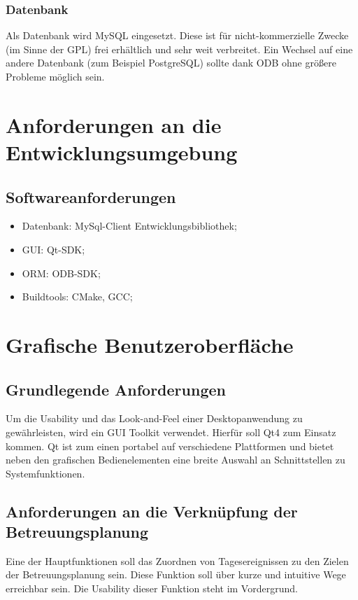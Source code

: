 \documentclass[a4paper,10pt]{article}
\begin{document}
\subsubsection{Datenbank}
Als Datenbank wird MySQL eingesetzt. Diese ist für nicht-kommerzielle Zwecke (im Sinne der GPL) frei erhältlich und sehr weit verbreitet. 
Ein Wechsel auf eine andere Datenbank (zum Beispiel PostgreSQL) sollte dank ODB ohne größere Probleme möglich sein.

\section{Anforderungen an die Entwicklungsumgebung}
\subsection{Softwareanforderungen}
\begin{itemize}
	\item Datenbank: MySql-Client Entwicklungsbibliothek;
	\item GUI: Qt-SDK; 
	\item ORM: ODB-SDK;
	\item Buildtools: CMake, GCC;
\end{itemize}
\section{Grafische Benutzeroberfläche}
\subsection{Grundlegende Anforderungen}
Um die Usability und das Look-and-Feel einer Desktopanwendung zu gewährleisten, wird ein GUI Toolkit verwendet.
Hierfür soll Qt4 zum Einsatz kommen. Qt ist zum einen portabel auf verschiedene Plattformen 
und bietet neben den grafischen Bedienelementen eine breite Auswahl an Schnittstellen zu Systemfunktionen.
\subsection{Anforderungen an die Verknüpfung der Betreuungsplanung}
Eine der Hauptfunktionen soll das Zuordnen von Tagesereignissen zu den Zielen der Betreuungsplanung sein. Diese Funktion soll über 
kurze und intuitive Wege erreichbar sein. Die Usability dieser Funktion steht im Vordergrund.
\end{document}

